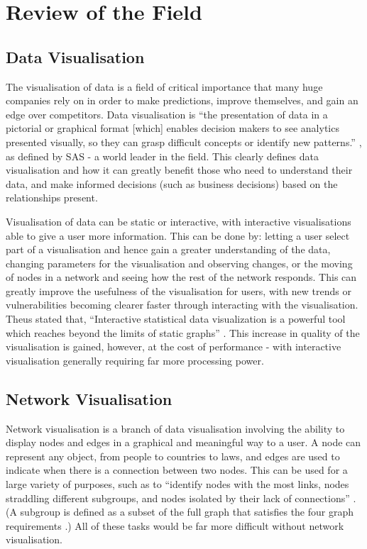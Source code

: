 \documentclass[../dissertation.tex]{subfiles}
\begin{document}
\chapter{Review of the Field}
\label{sec:review-of-field}

\section{Data Visualisation}

The visualisation of data is a field of critical importance that many huge companies rely on in order to make predictions, improve themselves, and gain an edge over competitors. Data visualisation is ``the presentation of data in a pictorial or graphical format [which] enables decision makers to see analytics presented visually, so they can grasp difficult concepts or identify new patterns.'' \cite{sasdv}, as defined by SAS - a world leader in the field. This clearly defines data visualisation and how it can greatly benefit those who need to understand their data, and make informed decisions (such as business decisions) based on the relationships present.

Visualisation of data can be static or interactive, with interactive visualisations able to give a user more information. This can be done by: letting a user select part of a visualisation and hence gain a greater understanding of the data, changing parameters for the visualisation and observing changes, or the moving of nodes in a network and seeing how the rest of the network responds. This can greatly improve the usefulness of the visualisation for users, with new trends or vulnerabilities becoming clearer faster through interacting with the visualisation. Theus stated that, ``Interactive statistical data visualization is a powerful tool which reaches beyond the limits of static graphs'' \cite{theus2002interactive}. This increase in quality of the visualisation is gained, however, at the cost of performance - with interactive visualisation generally requiring far more processing power. 

\section{Network Visualisation}

Network visualisation is a branch of data visualisation involving the ability to display nodes and edges in a graphical and meaningful way to a user. A node can represent any object, from people to countries to laws, and edges are used to indicate when there is a connection between two nodes. This can be used for a large variety of purposes, such as to ``identify nodes with the most links, nodes straddling different subgroups, and nodes isolated by their lack of connections'' \cite{flowingdata}. (A subgroup is defined as a subset of the full graph that satisfies the four graph requirements \cite{scott2012group} \cite{anderson2012subgroup}.) All of these tasks would be far more difficult without network visualisation.
\end{document}
